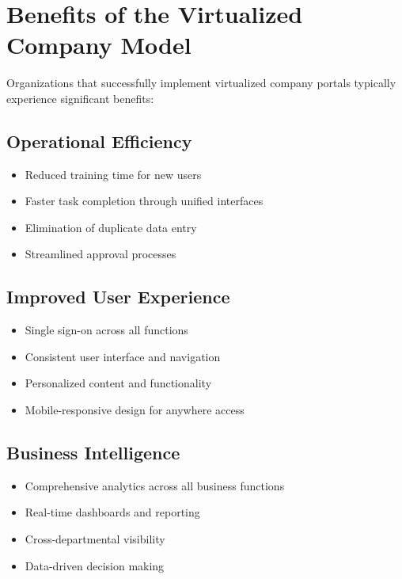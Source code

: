 \section{Benefits of the Virtualized Company Model}
\label{sec:benefits}

Organizations that successfully implement virtualized company portals typically experience significant benefits:

\subsection{Operational Efficiency}

\begin{itemize}
	\item Reduced training time for new users
	\item Faster task completion through unified interfaces
	\item Elimination of duplicate data entry
	\item Streamlined approval processes
\end{itemize}

\subsection{Improved User Experience}

\begin{itemize}
	\item Single sign-on across all functions
	\item Consistent user interface and navigation
	\item Personalized content and functionality
	\item Mobile-responsive design for anywhere access
\end{itemize}

\subsection{Business Intelligence}

\begin{itemize}
	\item Comprehensive analytics across all business functions
	\item Real-time dashboards and reporting
	\item Cross-departmental visibility
	\item Data-driven decision making
\end{itemize}

